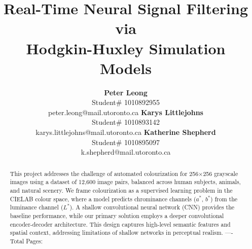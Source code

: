 \documentclass{article} %
\title{Real-Time Neural Signal Filtering via \\
Hodgkin-Huxley Simulation Models}
\author{\textbf{Peter Leong} \\
    Student\# 1010892955 \\
    peter.leong@mail.utoronto.ca
\And
    \textbf{Karys Littlejohns} \\
    Student\# 1010893142 \\
    karys.littlejohns@mail.utoronto.ca
\And
    \textbf{Katherine Shepherd} \\
    Student\# 1010895097 \\
    k.shepherd@mail.utoronto.ca
}
\begin{document}
\maketitle


\begin{abstract}
This project addresses the challenge of automated colourization for 256$\times$256 grayscale images using a dataset of 12,600 image pairs, balanced across human subjects, 
animals, and natural scenery. We frame colourization as a supervised learning problem in the CIELAB colour space, where a model predicts chrominance channels ($a^*$, $b^*$) 
from the luminance channel ($L^*$). A shallow convolutional neural network (CNN) provides the baseline performance, while our primary solution employs a deeper convolutional 
encoder-decoder architecture. This design captures high-level semantic features and spatial context, addressing limitations of shallow networks in perceptual realism.
----Total Pages: \pageref{last_page}
\end{abstract}

\vspace{2ex}
\end{document}

